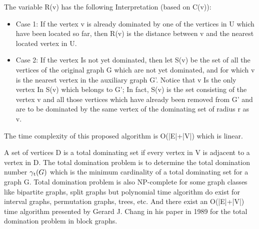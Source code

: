 \documentclass{memoir}
\begin{document}
The variable R(v) has the following Interpretation (based on C(v)):
\begin{itemize}[noitemsep]
    \item Case 1: If the vertex v is already dominated by one of the vertices in U which have been located so far, then R(v) is the distance between v and the nearest located vertex in U.
    \item Case 2: If the vertex Is not yet dominated, then let S(v) be
    the set of all the vertices of the original graph G which are not
    yet dominated, and for which v is the nearest vertex in the auxiliary graph G'. Notice that v Is the only vertex In S(v) which belongs to G'; In fact, S(v) is the set consisting of the vertex v and all those vertices which have already been removed from G' and are to be dominated by the same vertex of the dominating set of radius r as v.
\end{itemize}
The time complexity of this proposed algorithm is O(|E|+|V|) which is linear.

\vspace{5mm}

A set of vertices D is a total dominating set if
every vertex in V is adjacent to a vertex in D. The total domination problem is to determine the total domination number \begin{math} \gamma\textsubscript{t} (G) \end{math} which is the minimum cardinality of a total dominating set for a graph G. Total domination problem is also NP-complete for some graph classes like bipartite graphs, split graphs but polynomial time algorithm do exist for interval graphs, permutation graphs, trees, etc. And there exist an O(|E|+|V|) time algorithm presented by Gerard J. Chang in his paper in 1989 for the total domination problem in block graphs.

% 
            
                    
\end{document}
